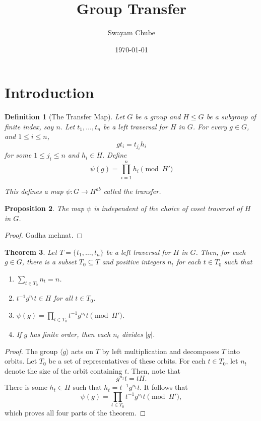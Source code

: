 \documentclass[12pt]{article}
\title{Group Transfer}
\author{Swayam Chube}
\date{\today}
\theoremstyle{thmstyle}
\newtheorem{theorem}{Theorem}[section]
\newtheorem{proposition}[theorem]{Proposition}
\theoremstyle{defstyle}
\newtheorem{definition}[theorem]{Definition}
\renewcommand{\le}{\leqslant}
\begin{document}
\maketitle

\section{Introduction}

\begin{definition}[The Transfer Map]
    Let $G$ be a group and $H\le G$ be a subgroup of finite index, say $n$. Let $t_1,\dots,t_n$ be a left traversal for $H$ in $G$. For every $g\in G$, and $1\le i\le n$, 
    \begin{equation*}
        gt_i = t_{j_i}h_i
    \end{equation*}
    for some $1\le j_i\le n$ and $h_i\in H$. Define 
    \begin{equation*}
        \psi(g) = \prod_{i = 1}^n h_i\pmod{H'}
    \end{equation*}

    This defines a map $\psi: G\to H^{ab}$ called the \emph{transfer}.
\end{definition}

\begin{proposition}
    The map $\psi$ is independent of the choice of coset traversal of $H$ in $G$.
\end{proposition}
\begin{proof}
    Gadha mehnat.
\end{proof}

\begin{theorem}
    Let $T = \{t_1,\dots,t_n\}$ be a left traversal for $H$ in $G$. Then, for each $g\in G$, there is a subset $T_0\subseteq T$ and positive integers $n_t$ for each $t\in T_0$ such that 
    \begin{enumerate}[label=(\alph*)]
        \item $\displaystyle\sum_{t\in T_0} n_t = n$.
        \item $\displaystyle t^{-1}g^{n_t}t\in H$ for all $t\in T_0$. 
        \item $\displaystyle\psi(g) = \prod_{t\in T_0} t^{-1}g^{n_t}t\pmod{H'}$.
        \item If $g$ has finite order, then each $n_t$ divides $|g|$.
    \end{enumerate}
\end{theorem}
\begin{proof}
    The group $\langle g\rangle$ acts on $T$ by left multiplication and decomposes $T$ into orbits. Let $T_0$ be a set of representatives of these orbits. For each $t\in T_0$, let $n_t$ denote the size of the orbit containing $t$. Then, note that 
    \begin{equation*}
        g^{n_t}t = tH.
    \end{equation*}
    There is some $h_t\in H$ such that $h_t = t^{-1} g^{n_t}t$. It follows that 
    \begin{equation*}
        \psi(g) = \prod_{t\in T_0} t^{-1}g^{n_t}t\pmod{H'},
    \end{equation*}
    which proves all four parts of the theorem.
\end{proof}
\end{document}
